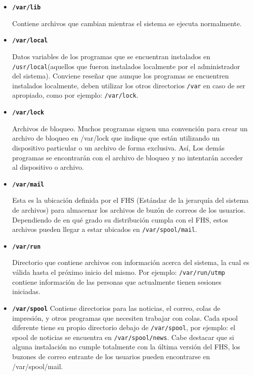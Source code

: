 \documentclass[12pt]{article}
\begin{document}
\begin{itemize}
	\item 

	\textbf{\texttt{/var/lib}} 
    
	 Contiene archivos que cambian mientras el sistema se
	ejecuta normalmente. 

	\item 
        

	\textbf{\texttt{/var/local}} 
        
	 Datos variables de los programas que se encuentran
	instalados en \texttt{/usr/local}(aquellos que fueron
	instalados localmente por el administrador del sistema). Conviene
	reseñar  		que aunque los programas se encuentren
	instalados localmente, deben 			utilizar los otros
	directorios \texttt{/var} en caso de ser
	apropiado, como por ejemplo:
	\texttt{/var/lock}.  

	\item 
	\textbf{\texttt{/var/lock}} 
        
	 Archivos de bloqueo. Muchos programas siguen una
	convención para crear un archivo de bloqueo en /var/lock que indique que
	están utilizando un dispositivo particular o un archivo de forma
	exclusiva. Así, Los demás programas se encontrarán con el archivo de
	bloqueo y no intentarán acceder al dispositivo o archivo.
	  


	\item 
        
	\textbf{\texttt{/var/mail}} 
        
	 Esta es la ubicación definida por el FHS (Estándar de la
	jerarquía del sistema de archivos) para almacenar los archivos de buzón
	de correos de los usuarios. Dependiendo de en qué 		grado su
	distribución cumpla con el FHS, estos archivos pueden 	llegar a
	estar ubicados en \texttt{/var/spool/mail}.
	  

	\item 

	\textbf{\texttt{/var/run}} 
        
	 Directorio que contiene archivos con información acerca
	del sistema, la cual es válida hasta el próximo inicio del mismo. Por
	ejemplo: \texttt{/var/run/utmp} contiene información de las
	personas que actualmente tienen sesiones iniciadas.  
	 

	\item 
        
	\textbf{\texttt{/var/spool}} 
	 Contiene directorios para las noticias, el correo, colas
	de impresión, y otros programas que necesiten trabajar con colas.
	Cada spool diferente tiene su propio directorio debajo de
	\texttt{/var/spool}, por ejemplo: el spool de noticias se
	encuentra en \texttt{/var/spool/news}. Cabe destacar que si
	alguna instalación no cumple totalmente con la última versión del
	FHS, los buzones de correo entrante de los usuarios pueden encontrarse
	en /var/spool/mail.   


\end{itemize}
\end{document}
